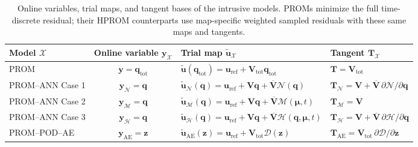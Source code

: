 \documentclass[11pt]{article}
\newcommand{\q}{\mathbf q}
\newcommand{\qtot}{\mathbf q_{\mathrm{tot}}}
\newcommand{\qp}{\q}
\newcommand{\uvec}{\mathbf u}
\newcommand{\utilde}{\widetilde{\mathbf u}}
\newcommand{\mub}{\bm\mu}
\newcommand{\z}{\mathbf z}
\begin{document}
\begin{table}[H]
\centering
\caption{Online variables, trial maps, and tangent bases of the intrusive
models.  PROMs minimize the full time-discrete residual; their HPROM
counterparts use map-specific weighted sampled residuals with these same
maps and tangents.}
\label{tab:trial-maps}
\small
\setlength{\tabcolsep}{3.5pt}
\renewcommand{\arraystretch}{1.15}
\begin{tabular}{@{}l|c|l|l@{}}
\toprule
Model $\mathcal X$ & Online variable $\mathbf y_{\mathcal X}$
& Trial map $\utilde_{\mathcal X}$ & Tangent $\mathbf T_{\mathcal X}$ \\
\midrule
PROM & $\mathbf y=\qtot$ & $\utilde(\qtot)=\uvec_{\mathrm{ref}}+\mathbf V_{\mathrm{tot}}\qtot$ & $\mathbf T=\mathbf V_{\mathrm{tot}}$ \\
PROM--ANN Case 1 & $\mathbf y_{\mathcal N}=\qp$ & $\utilde_{\mathcal N}(\qp)=\uvec_{\mathrm{ref}}+\mathbf V\qp+\overline{\mathbf V}\mathcal N(\qp)$ & $\mathbf T_{\mathcal N}=\mathbf V+\overline{\mathbf V}\,\partial\mathcal N/\partial\qp$ \\
PROM--ANN Case 2 & $\mathbf y_{\mathcal M}=\qp$ & $\utilde_{\mathcal M}(\qp)=\uvec_{\mathrm{ref}}+\mathbf V\qp+\overline{\mathbf V}\mathcal M(\mub,t)$ & $\mathbf T_{\mathcal M}=\mathbf V$ \\
PROM--ANN Case 3 & $\mathbf y_{\mathcal H}=\qp$ & $\utilde_{\mathcal H}(\qp)=\uvec_{\mathrm{ref}}+\mathbf V\qp+\overline{\mathbf V}\mathcal H(\qp,\mub,t)$ & $\mathbf T_{\mathcal H}=\mathbf V+\overline{\mathbf V}\,\partial\mathcal H/\partial\qp$ \\
PROM--POD--AE & $\mathbf y_{\mathrm{AE}}=\z$ & $\utilde_{\mathrm{AE}}(\z)=\uvec_{\mathrm{ref}}+\mathbf V_{\mathrm{tot}}\mathcal D(\z)$ & $\mathbf T_{\mathrm{AE}}=\mathbf V_{\mathrm{tot}}\,\partial\mathcal D/\partial\z$ \\
\bottomrule
\end{tabular}
\end{table}
\end{document}
